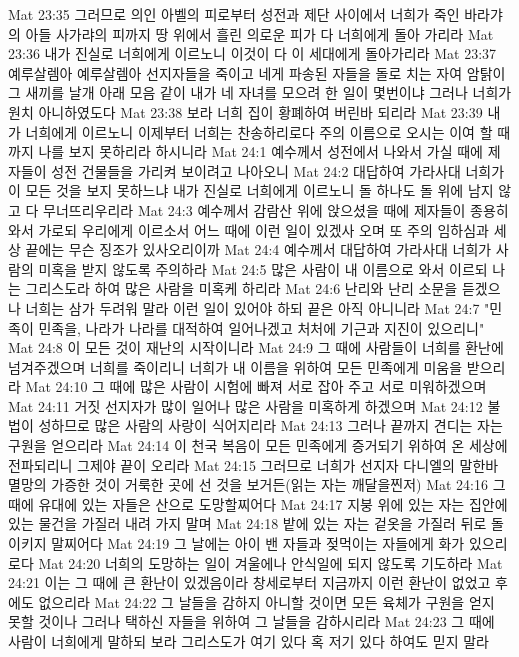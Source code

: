 Mat 23:35  그러므로 의인 아벨의 피로부터 성전과 제단 사이에서 너희가 죽인 바라갸의 아들 사가랴의 피까지 땅 위에서 흘린 의로운 피가 다 너희에게 돌아 가리라
Mat 23:36  내가 진실로 너희에게 이르노니 이것이 다 이 세대에게 돌아가리라
Mat 23:37  예루살렘아 예루살렘아 선지자들을 죽이고 네게 파송된 자들을 돌로 치는 자여 암탉이 그 새끼를 날개 아래 모음 같이 내가 네 자녀를 모으려 한 일이 몇번이냐 그러나 너희가 원치 아니하였도다
Mat 23:38  보라 너희 집이 황폐하여 버린바 되리라
Mat 23:39  내가 너희에게 이르노니 이제부터 너희는 찬송하리로다 주의 이름으로 오시는 이여 할 때까지 나를 보지 못하리라 하시니라
Mat 24:1  예수께서 성전에서 나와서 가실 때에 제자들이 성전 건물들을 가리켜 보이려고 나아오니
Mat 24:2  대답하여 가라사대 너희가 이 모든 것을 보지 못하느냐 내가 진실로 너희에게 이르노니 돌 하나도 돌 위에 남지 않고 다 무너뜨리우리라
Mat 24:3  예수께서 감람산 위에 앉으셨을 때에 제자들이 종용히 와서 가로되 우리에게 이르소서 어느 때에 이런 일이 있겠사 오며 또 주의 임하심과 세상 끝에는 무슨 징조가 있사오리이까
Mat 24:4  예수께서 대답하여 가라사대 너희가 사람의 미혹을 받지 않도록 주의하라
Mat 24:5  많은 사람이 내 이름으로 와서 이르되 나는 그리스도라 하여 많은 사람을 미혹케 하리라
Mat 24:6  난리와 난리 소문을 듣겠으나 너희는 삼가 두려워 말라 이런 일이 있어야 하되 끝은 아직 아니니라
Mat 24:7  "민족이 민족을, 나라가 나라를 대적하여 일어나겠고 처처에 기근과 지진이 있으리니"
Mat 24:8  이 모든 것이 재난의 시작이니라
Mat 24:9  그 때에 사람들이 너희를 환난에 넘겨주겠으며 너희를 죽이리니 너희가 내 이름을 위하여 모든 민족에게 미움을 받으리라
Mat 24:10  그 때에 많은 사람이 시험에 빠져 서로 잡아 주고 서로 미워하겠으며
Mat 24:11  거짓 선지자가 많이 일어나 많은 사람을 미혹하게 하겠으며
Mat 24:12  불법이 성하므로 많은 사람의 사랑이 식어지리라
Mat 24:13  그러나 끝까지 견디는 자는 구원을 얻으리라
Mat 24:14  이 천국 복음이 모든 민족에게 증거되기 위하여 온 세상에 전파되리니 그제야 끝이 오리라
Mat 24:15  그러므로 너희가 선지자 다니엘의 말한바 멸망의 가증한 것이 거룩한 곳에 선 것을 보거든(읽는 자는 깨달을찐저)
Mat 24:16  그 때에 유대에 있는 자들은 산으로 도망할찌어다
Mat 24:17  지붕 위에 있는 자는 집안에 있는 물건을 가질러 내려 가지 말며
Mat 24:18  밭에 있는 자는 겉옷을 가질러 뒤로 돌이키지 말찌어다
Mat 24:19  그 날에는 아이 밴 자들과 젖먹이는 자들에게 화가 있으리로다
Mat 24:20  너희의 도망하는 일이 겨울에나 안식일에 되지 않도록 기도하라
Mat 24:21  이는 그 때에 큰 환난이 있겠음이라 창세로부터 지금까지 이런 환난이 없었고 후에도 없으리라
Mat 24:22  그 날들을 감하지 아니할 것이면 모든 육체가 구원을 얻지 못할 것이나 그러나 택하신 자들을 위하여 그 날들을 감하시리라
Mat 24:23  그 때에 사람이 너희에게 말하되 보라 그리스도가 여기 있다 혹 저기 있다 하여도 믿지 말라
